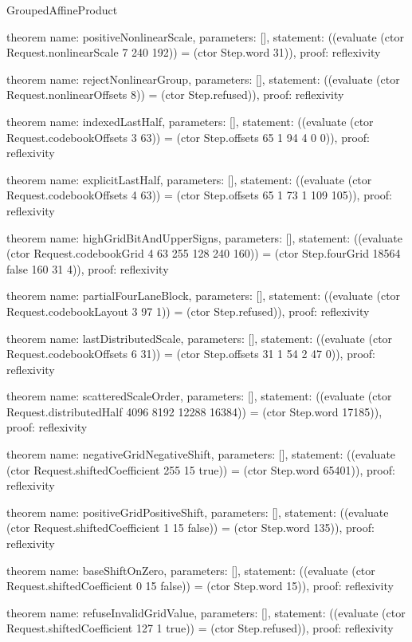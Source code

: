 \begin{lexlean}{GroupedAffineProduct}
\begin{semanticmodule}
theorem{
  name: positiveNonlinearScale,
  parameters: [],
  statement: ((evaluate (ctor Request.nonlinearScale 7 240 192)) = (ctor Step.word 31)),
  proof: reflexivity{}
}

theorem{
  name: rejectNonlinearGroup,
  parameters: [],
  statement: ((evaluate (ctor Request.nonlinearOffsets 8)) = (ctor Step.refused)),
  proof: reflexivity{}
}

theorem{
  name: indexedLastHalf,
  parameters: [],
  statement: ((evaluate (ctor Request.codebookOffsets 3 63)) = (ctor Step.offsets 65 1 94 4 0 0)),
  proof: reflexivity{}
}

theorem{
  name: explicitLastHalf,
  parameters: [],
  statement: ((evaluate (ctor Request.codebookOffsets 4 63)) = (ctor Step.offsets 65 1 73 1 109 105)),
  proof: reflexivity{}
}

theorem{
  name: highGridBitAndUpperSigns,
  parameters: [],
  statement: ((evaluate (ctor Request.codebookGrid 4 63 255 128 240 160)) = (ctor Step.fourGrid 18564 false 160 31 4)),
  proof: reflexivity{}
}

theorem{
  name: partialFourLaneBlock,
  parameters: [],
  statement: ((evaluate (ctor Request.codebookLayout 3 97 1)) = (ctor Step.refused)),
  proof: reflexivity{}
}

theorem{
  name: lastDistributedScale,
  parameters: [],
  statement: ((evaluate (ctor Request.codebookOffsets 6 31)) = (ctor Step.offsets 31 1 54 2 47 0)),
  proof: reflexivity{}
}

theorem{
  name: scatteredScaleOrder,
  parameters: [],
  statement: ((evaluate (ctor Request.distributedHalf 4096 8192 12288 16384)) = (ctor Step.word 17185)),
  proof: reflexivity{}
}

theorem{
  name: negativeGridNegativeShift,
  parameters: [],
  statement: ((evaluate (ctor Request.shiftedCoefficient 255 15 true)) = (ctor Step.word 65401)),
  proof: reflexivity{}
}

theorem{
  name: positiveGridPositiveShift,
  parameters: [],
  statement: ((evaluate (ctor Request.shiftedCoefficient 1 15 false)) = (ctor Step.word 135)),
  proof: reflexivity{}
}

theorem{
  name: baseShiftOnZero,
  parameters: [],
  statement: ((evaluate (ctor Request.shiftedCoefficient 0 15 false)) = (ctor Step.word 15)),
  proof: reflexivity{}
}

theorem{
  name: refuseInvalidGridValue,
  parameters: [],
  statement: ((evaluate (ctor Request.shiftedCoefficient 127 1 true)) = (ctor Step.refused)),
  proof: reflexivity{}
}
\end{semanticmodule}
\end{lexlean}
